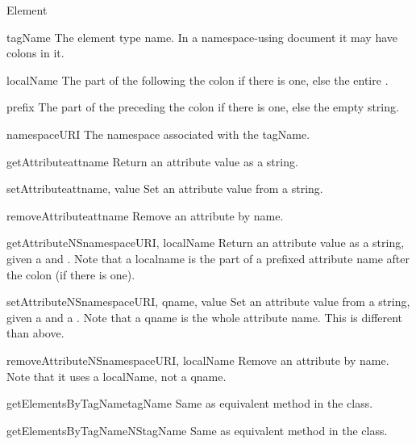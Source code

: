 \begin{classdesc}{Element}{}
\begin{memberdesc}{tagName}
The element type name.  In a namespace-using document it may have
colons in it.
\end{memberdesc}

\begin{memberdesc}{localName}
The part of the  following the colon if there is one,
else the entire .
\end{memberdesc}

\begin{memberdesc}{prefix}
The part of the  preceding the colon if there is one,
else the empty string.
\end{memberdesc}

\begin{memberdesc}{namespaceURI}
The namespace associated with the tagName.
\end{memberdesc}

\begin{methoddesc}{getAttribute}{attname}
Return an attribute value as a string.
\end{methoddesc}

\begin{methoddesc}{setAttribute}{attname, value}
Set an attribute value from a string.
\end{methoddesc}

\begin{methoddesc}{removeAttribute}{attname}
Remove an attribute by name.
\end{methoddesc}

\begin{methoddesc}{getAttributeNS}{namespaceURI, localName}
Return an attribute value as a string, given a  and
.  Note that a localname is the part of a prefixed
attribute name after the colon (if there is one).
\end{methoddesc}

\begin{methoddesc}{setAttributeNS}{namespaceURI, qname, value}
Set an attribute value from a string, given a  and a
.  Note that a qname is the whole attribute name.  This is
different than above.
\end{methoddesc}

\begin{methoddesc}{removeAttributeNS}{namespaceURI, localName}
Remove an attribute by name.  Note that it uses a localName, not a
qname.
\end{methoddesc}

\begin{methoddesc}{getElementsByTagName}{tagName}
Same as equivalent method in the  class.
\end{methoddesc}

\begin{methoddesc}{getElementsByTagNameNS}{tagName}
Same as equivalent method in the  class.
\end{methoddesc}

\end{classdesc}


